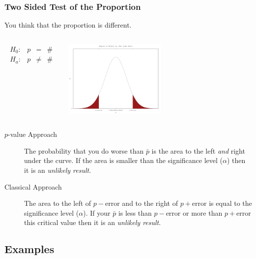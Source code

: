 \begin{frame}
  \frametitle{Two Sided Test of the Proportion}

  \vspace*{-1em}

  You think that the proportion is different.

  \begin{columns}
    \begin{eqnarray*}
      \begin{array}{lrcl}
        H_0: & p & = & \# \\
        H_a: & p & \neq & \#
      \end{array}
    \end{eqnarray*}


    \includegraphics[width=5cm]{img/twoSideHypothesisTest}

  \end{columns}

  \begin{description}
  \item[$p$-value Approach] The probability that you do worse than
    $\bar{p}$ is the area to the left \textit{and} right under the
    curve. If the area is smaller than the significance level
    ($\alpha$) then it is an \textit{unlikely result}.
  \item[Classical Approach] The area to the left of
    $p-\mathrm{error}$ and to the right of $p+\mathrm{error}$ is
    equal to the significance level ($\alpha$). If your $\bar{p}$ is
    less than $p-\mathrm{error}$ or more than $p+\mathrm{error}$
    this critical value then it is an \textit{unlikely result}.
  \end{description}


\end{frame}





\subsection{Examples}

